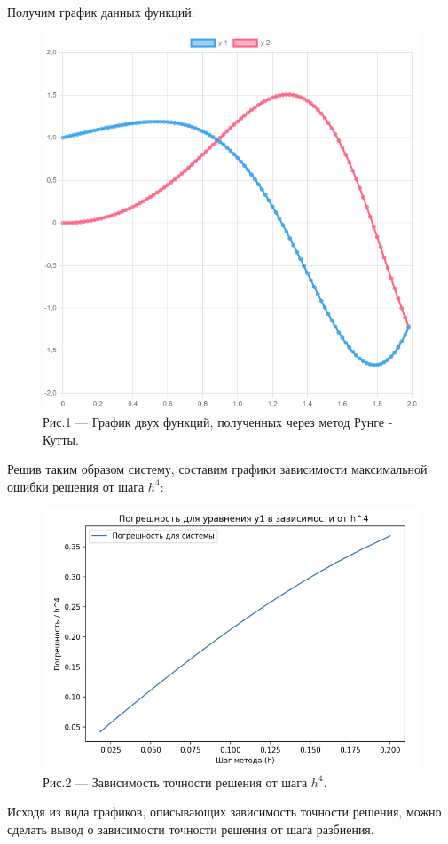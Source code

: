 \documentclass[a4paper,12pt]{article}
\begin{document}
Получим график данных функций:
\begin{figure}[h]
    \centering
    \includegraphics[width=0.5\linewidth]{pictures/testTaskResult.png}
    \captionsetup{labelformat=empty}
    \caption{Рис.1 --- График двух функций, полученных через метод Рунге - Кутты.}
\end{figure}
\newpage

Решив таким образом систему, составим графики зависимости максимальной ошибки решения от шага $h^4$:
\begin{figure}[h]
    \centering
    \includegraphics[width=0.5\linewidth]{pictures/testTask.png}
    \captionsetup{labelformat=empty}
    \caption{Рис.2 --- Зависимость точности решения от шага $h^4$.}
\end{figure}

Исходя из вида графиков, описывающих зависимость точности решения, можно сделать вывод
о зависимости точности решения от шага разбиения. 

\newpage
\end{document}
